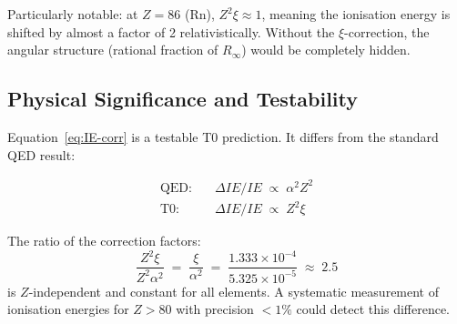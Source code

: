 \begin{table}[htbp]
\centering
\caption{T0 correction of ionisation energies for $Z > 54$}
\label{tab:heavy-elements}
\end{table}

Particularly notable: at $Z = 86$ (Rn), $Z^2\xi \approx 1$, meaning
the ionisation energy is shifted by almost a factor of 2 relativistically.
Without the $\xi$-correction, the angular structure (rational fraction of
$R_\infty$) would be completely hidden.

\subsection{Physical Significance and Testability}
\label{subsec:significance}

Equation~\eqref{eq:IE-corr} is a testable T0 prediction.
It differs from the standard QED result:

\begin{align}
  \text{QED:}\quad &\Delta IE/IE \;\propto\; \alpha^2 Z^2 \\
  \text{T0:}\quad  &\Delta IE/IE \;\propto\; Z^2 \xi
\end{align}

The ratio of the correction factors:
\begin{equation}
  \frac{Z^2 \xi}{Z^2 \alpha^2} \;=\; \frac{\xi}{\alpha^2}
  \;=\; \frac{1.333 \times 10^{-4}}{5.325 \times 10^{-5}}
  \;\approx\; 2.5
\end{equation}
is $Z$-independent and constant for all elements. A systematic measurement
of ionisation energies for $Z > 80$ with precision $<1\%$ could detect
this difference.

